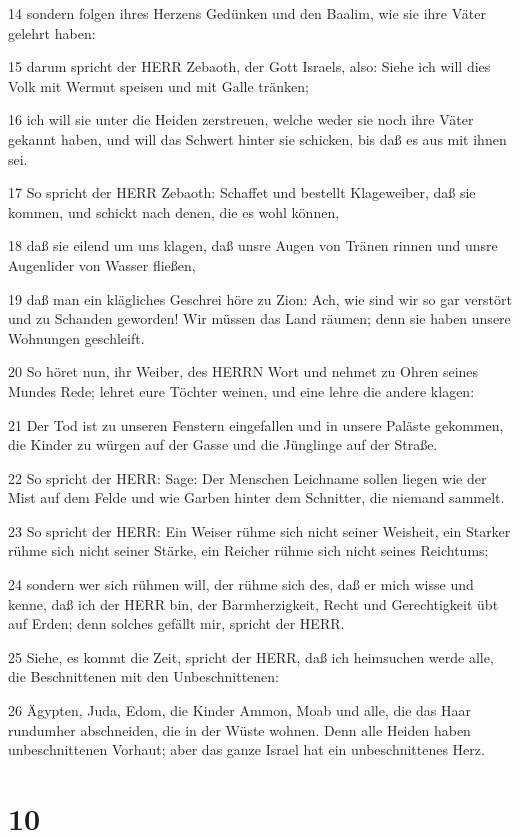 \par 14 sondern folgen ihres Herzens Gedünken und den Baalim, wie sie ihre Väter gelehrt haben:
\par 15 darum spricht der HERR Zebaoth, der Gott Israels, also: Siehe ich will dies Volk mit Wermut speisen und mit Galle tränken;
\par 16 ich will sie unter die Heiden zerstreuen, welche weder sie noch ihre Väter gekannt haben, und will das Schwert hinter sie schicken, bis daß es aus mit ihnen sei.
\par 17 So spricht der HERR Zebaoth: Schaffet und bestellt Klageweiber, daß sie kommen, und schickt nach denen, die es wohl können,
\par 18 daß sie eilend um uns klagen, daß unsre Augen von Tränen rinnen und unsre Augenlider von Wasser fließen,
\par 19 daß man ein klägliches Geschrei höre zu Zion: Ach, wie sind wir so gar verstört und zu Schanden geworden! Wir müssen das Land räumen; denn sie haben unsere Wohnungen geschleift.
\par 20 So höret nun, ihr Weiber, des HERRN Wort und nehmet zu Ohren seines Mundes Rede; lehret eure Töchter weinen, und eine lehre die andere klagen:
\par 21 Der Tod ist zu unseren Fenstern eingefallen und in unsere Paläste gekommen, die Kinder zu würgen auf der Gasse und die Jünglinge auf der Straße.
\par 22 So spricht der HERR: Sage: Der Menschen Leichname sollen liegen wie der Mist auf dem Felde und wie Garben hinter dem Schnitter, die niemand sammelt.
\par 23 So spricht der HERR: Ein Weiser rühme sich nicht seiner Weisheit, ein Starker rühme sich nicht seiner Stärke, ein Reicher rühme sich nicht seines Reichtums;
\par 24 sondern wer sich rühmen will, der rühme sich des, daß er mich wisse und kenne, daß ich der HERR bin, der Barmherzigkeit, Recht und Gerechtigkeit übt auf Erden; denn solches gefällt mir, spricht der HERR.
\par 25 Siehe, es kommt die Zeit, spricht der HERR, daß ich heimsuchen werde alle, die Beschnittenen mit den Unbeschnittenen:
\par 26 Ägypten, Juda, Edom, die Kinder Ammon, Moab und alle, die das Haar rundumher abschneiden, die in der Wüste wohnen. Denn alle Heiden haben unbeschnittenen Vorhaut; aber das ganze Israel hat ein unbeschnittenes Herz.

\chapter{10}

